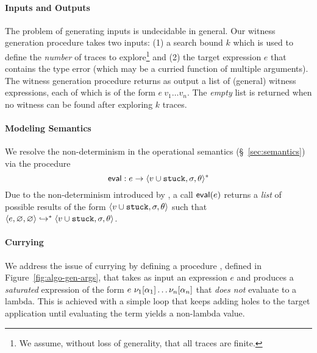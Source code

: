 \paragraph{Inputs and Outputs}
%
The problem of generating inputs is undecidable in general.
%
Our witness generation procedure takes two inputs:
%
(1) a search bound $k$ which is used to define the \emph{number} of
traces to explore\footnote{We assume, without loss of generality, that all
traces are finite.} and
%
(2) the target expression $e$ that contains the type error
(which may be a curried function of multiple arguments).
%
The witness generation procedure returns as output a list of (general)
witness expressions, each of which is of the form $e\ v_1 \ldots v_n$.
%
The \emph{empty} list is returned when no witness can be found after
exploring $k$ traces.


\paragraph{Modeling Semantics}
%
We resolve the non-determinism in the operational semantics
(\S~\ref{sec:semantics}) via the procedure
%
$$
\mathsf{eval} : e \rightarrow \langle v \cup \mathtt{stuck}, \sigma, \theta \rangle^{*}
$$
%
Due to the non-determinism introduced by \gensym, a call
$\mathsf{eval}(e)$ returns a \emph{list}
of possible results of the form $\langle v \cup \mathtt{stuck}, \sigma, \theta \rangle$
such that $\langle e, \varnothing, \varnothing \rangle \hookrightarrow^{*} \langle v \cup \mathtt{stuck}, \sigma, \theta \rangle{}$.

\paragraph{Currying}
We address the issue of currying by defining a procedure ,
defined in Figure~\ref{fig:algo-gen-args}, that takes as input an
expression $e$ and produces a \emph{saturated} expression of the form
$e\ \nu_1[\alpha_1] \ldots \nu_n[\alpha_n]$ that
\emph{does not} evaluate to a lambda.
%
This is achieved with a simple loop that keeps adding holes to the
target application until evaluating the term yields a non-lambda value.
%
%

